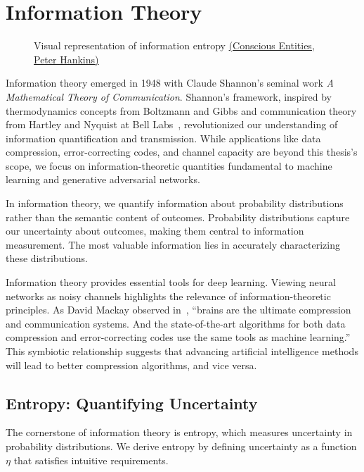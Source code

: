 \section{Information Theory}%
\label{sec:information-theory}
\vspace{0.5cm}
\begin{figure}[h!]%
  \label{fig:info}
  \centering
  \caption{Visual representation of information entropy \href{https://www.consciousentities.com/2017/02/consciousness-entropy/}{(Conscious Entities, Peter Hankins)}}
\end{figure}
\vspace{0.5cm}

Information theory emerged in 1948 with Claude Shannon's seminal work \textit{A Mathematical Theory of Communication}. Shannon's framework, inspired by thermodynamics concepts from Boltzmann and Gibbs and communication theory from Hartley and Nyquist at Bell Labs~\cite{ref:losee-1997}, revolutionized our understanding of information quantification and transmission. While applications like data compression, error-correcting codes, and channel capacity are beyond this thesis's scope, we focus on information-theoretic quantities fundamental to machine learning and generative adversarial networks.

\begin{remark}
  In information theory, we quantify information about probability distributions rather than the semantic content of outcomes. Probability distributions capture our uncertainty about outcomes, making them central to information measurement. The most valuable information lies in accurately characterizing these distributions.
\end{remark}

Information theory provides essential tools for deep learning. Viewing neural networks as noisy channels highlights the relevance of information-theoretic principles. As David Mackay observed in~\cite{ref:mackay-2003}, ``brains are the ultimate compression and communication systems. And the state-of-the-art algorithms for both data compression and error-correcting codes use the same tools as machine learning.'' This symbiotic relationship suggests that advancing artificial intelligence methods will lead to better compression algorithms, and vice versa.

\subsection{Entropy: Quantifying Uncertainty}
The cornerstone of information theory is entropy, which measures uncertainty in probability distributions. We derive entropy by defining uncertainty as a function $\eta$ that satisfies intuitive requirements.

